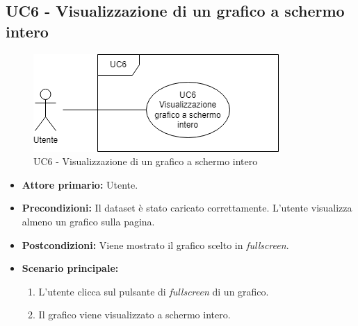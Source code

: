 \newpage


\subsection{UC6 - Visualizzazione di un grafico a schermo intero}
\begin{figure}[h!]
	\centering
	\includegraphics[scale=0.55]{../../assets/visualizzazione_fullscreen.png}
	\caption{UC6 - Visualizzazione di un grafico a schermo intero}
\end{figure}

\begin{itemize}
	\item \textbf{Attore primario:} Utente.
	\item \textbf{Precondizioni:} Il dataset è stato caricato correttamente. L'utente visualizza almeno un grafico sulla pagina. 
	\item \textbf{Postcondizioni:} 
	Viene mostrato il grafico scelto in \textit{fullscreen}.
	\item \textbf{Scenario principale:}
		\begin{enumerate}
			\item L'utente clicca sul pulsante di \textit{fullscreen} di un grafico.
			\item Il grafico viene visualizzato a schermo intero.
		\end{enumerate}
\end{itemize}
\newpage


